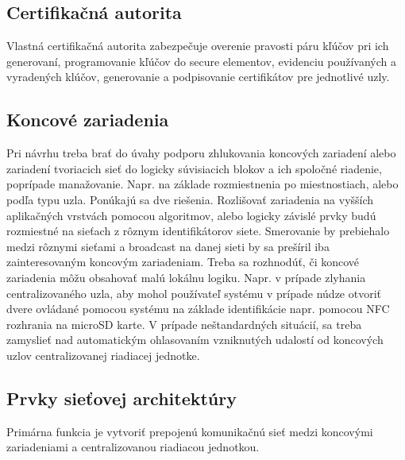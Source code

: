 \documentclass[12pt,a4wide,oneside,openright]{report}
\begin{document}
\subsection{Certifikačná autorita}
Vlastná certifikačná autorita zabezpečuje overenie pravosti páru kľúčov pri ich generovaní, programovanie kľúčov do secure elementov, evidenciu používaných a vyradených klúčov, generovanie a podpisovanie certifikátov pre jednotlivé uzly.

\subsection{Koncové zariadenia} 
Pri návrhu treba brať do úvahy podporu zhlukovania koncových zariadení alebo zariadení tvoriacich sieť do logicky súvisiacich blokov a ich spoločné riadenie, poprípade manažovanie. Napr. na základe rozmiestnenia po miestnostiach, alebo podľa typu uzla. Ponúkajú sa dve riešenia. Rozlišovať zariadenia na vyšších aplikačných vrstvách pomocou algoritmov, alebo logicky závislé prvky budú rozmiestné na sieťach z rôznym identifikátorov siete. Smerovanie by prebiehalo medzi rôznymi sieťami a broadcast na danej sieti by sa prešíril iba zainteresovaným koncovým zariadeniam.
Treba sa rozhnodúť, či koncové zariadenia môžu obsahovať malú lokálnu logiku. Napr. v prípade zlyhania centralizovaného uzla, aby mohol používateľ systému v prípade núdze otvoriť dvere ovládané pomocou systému na základe identifikácie napr. pomocou NFC rozhrania na microSD karte.
V prípade neštandardných situácií, sa treba zamyslieť nad automatickým ohlasovaním vzniknutých udalostí od koncových uzlov centralizovanej riadiacej jednotke.

\subsection{Prvky sieťovej architektúry}
Primárna funkcia je vytvoriť prepojenú komunikačnú sieť medzi koncovými zariadeniami a centralizovanou riadiacou jednotkou.
\end{document}
